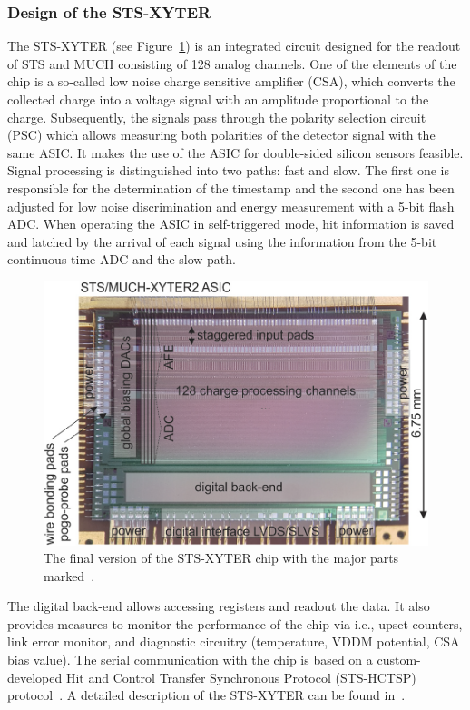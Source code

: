 \subsubsection{Design of the STS-XYTER}

The STS-XYTER (see Figure~\ref{sts_xyter}) is an integrated circuit designed for the readout of \gls{STS} and \gls{MUCH} consisting of 128 analog channels. One of the elements of the chip is a so-called low noise charge sensitive amplifier (\gls{CSA}), which converts the collected charge into a voltage signal with an amplitude proportional to the charge. Subsequently, the signals pass through the polarity selection circuit (\gls{PSC}) which allows measuring both polarities
  of the detector signal with the same ASIC. It makes the use of the \gls{ASIC} for double-sided silicon sensors feasible. Signal processing is distinguished into two paths: fast and slow. The first one is responsible for the determination of the timestamp and the second one has been adjusted for low noise discrimination and energy measurement with a 5-bit flash ADC. When operating the \gls{ASIC} in self-triggered mode, hit information is saved and latched by the arrival of each signal using the information from the 5-bit continuous-time ADC and the slow path. 

\begin{figure}[!h]
\centering
\includegraphics[width=0.65\columnwidth]{Chapter2/images/ASIC2.2.png}
\caption{The final version of the STS-XYTER chip with the major parts marked~\cite{KASINSKI2018225}.}
\label{sts_xyter}
\end{figure}

The digital back-end allows accessing registers and readout the data. It also provides measures to monitor the performance of the chip via i.e., upset counters, link error monitor, and diagnostic circuitry (temperature, VDDM potential, CSA bias value). The serial communication with the chip is based on a custom-developed Hit and Control Transfer Synchronous Protocol (STS-HCTSP) protocol~\cite{Kasinski_2016}. A detailed description of the STS-XYTER can be found in~\cite{RodriguezRodriguez2020}.

